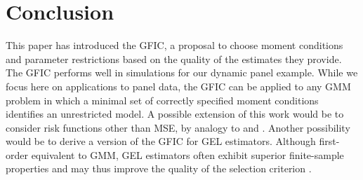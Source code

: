 
\section{Conclusion}
\label{sec:conclude}
This paper has introduced the GFIC, a proposal to choose moment conditions and parameter restrictions based on the quality of the estimates they provide. 
The GFIC performs well in simulations for our dynamic panel example. 
While we focus here on applications to panel data, the GFIC can be applied to any GMM problem in which a minimal set of correctly specified moment conditions identifies an unrestricted model. 
A possible extension of this work would be to consider risk functions other than MSE, by analogy to \cite{ClaeskensCroux2006} and \cite{ClaeskensHjort2008}.
Another possibility would be to derive a version of the GFIC for GEL estimators. 
Although first-order equivalent to GMM, GEL estimators often exhibit superior finite-sample properties and may thus improve the quality of the selection criterion \citep{NeweySmith}. 
